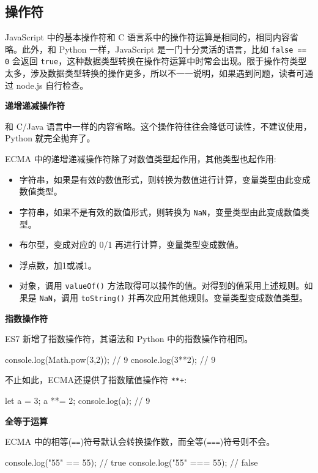 \subsection{操作符}

JavaScript 中的基本操作符和 C 语言系中的操作符运算是相同的，相同内容省略。此外，和 Python 一样，JavaScript 是一门十分灵活的语言，比如 \texttt{false == 0} 会返回 \texttt{true}，这种数据类型转换在操作符运算中时常会出现。限于操作符类型太多，涉及数据类型转换的操作更多，所以不一一说明，如果遇到问题，读者可通过 node.js 自行检查。

\noindent\textbf{递增递减操作符}

和 C/Java 语言中一样的内容省略。这个操作符往往会降低可读性，不建议使用，Python 就完全抛弃了。

ECMA 中的递增递减操作符除了对数值类型起作用，其他类型也起作用:
\begin{itemize}
    \item 字符串，如果是有效的数值形式，则转换为数值进行计算，变量类型由此变成数值类型。
    \item 字符串，如果不是有效的数值形式，则转换为 \texttt{NaN}，变量类型由此变成数值类型。
    \item 布尔型，变成对应的 0/1 再进行计算，变量类型变成数值。
    \item 浮点数，加1或减1。
    \item 对象，调用 \texttt{valueOf()} 方法取得可以操作的值。对得到的值采用上述规则。如果是 \texttt{NaN}，调用 \texttt{toString()} 并再次应用其他规则。变量类型变成数值类型。
\end{itemize}

\noindent\textbf{指数操作符}

ES7 新增了指数操作符，其语法和 Python 中的指数操作符相同。

\begin{JavaScript}
console.log(Math.pow(3,2));     // 9
cnosole.log(3**2);              // 9
\end{JavaScript}

不止如此，ECMA还提供了指数赋值操作符 \texttt{**+}:

\begin{JavaScript}
let a = 3;
a **= 2;
console.log(a);     // 9
\end{JavaScript}

\noindent\textbf{全等于运算}

ECMA 中的相等(\texttt{==})符号默认会转换操作数，而全等(\texttt{===})符号则不会。

\begin{JavaScript}
console.log("55" == 55);    // true
console.log("55" === 55);   // false
\end{JavaScript}

